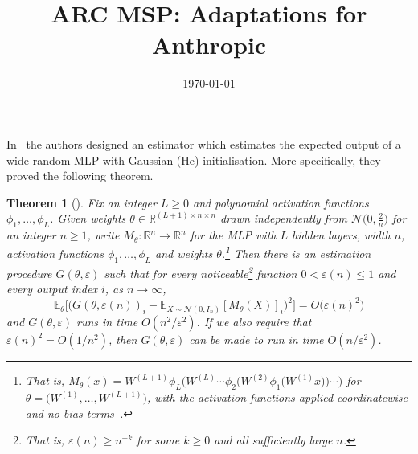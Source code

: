 \documentclass[11pt]{article}
\title{ARC MSP: Adaptations for Anthropic}
\author{}
\date{\today}
\newtheorem{theorem}{Theorem}
\theoremstyle{remark}
\begin{document}
\maketitle

In~\cite{MSP-ARC} the authors designed an estimator which estimates the expected output of a wide random MLP with Gaussian (He) initialisation.
More specifically, they proved the following theorem.

\begin{theorem}[{\cite[Theorems~5.1 and~5.2]{MSP-ARC}}]\label{thm:msp-arc-init}
Fix an integer $L \geq 0$ and polynomial activation functions $\phi_1, \dots, \phi_L$. Given weights $\theta \in \mathbb{R}^{(L+1) \times n \times n}$ drawn independently from $\mathcal{N}\big(0, \frac{2}{n}\big)$ for an integer $n \geq 1$, write $M_\theta \colon \mathbb{R}^n \to \mathbb{R}^n$ for the MLP with $L$ hidden layers, width $n$, activation functions $\phi_1, \dots, \phi_L$ and weights $\theta$.\footnote{That is, $M_\theta(x) = W^{(L+1)} \phi_L\big(W^{(L)} \cdots \phi_2\big(W^{(2)} \phi_1\big(W^{(1)} x\big)\big) \cdots\big)$ for $\theta = \big(W^{(1)}, \dots, W^{(L+1)}\big)$, with the activation functions applied coordinatewise and no bias terms~\cite[Section~2.1]{MSP-ARC}.} Then there is an estimation procedure $G(\theta, \varepsilon)$ such that for every noticeable\footnote{That is, $\varepsilon(n) \geq n^{-k}$ for some $k \geq 0$ and all sufficiently large $n$.} function $0 < \varepsilon(n) \leq 1$ and every output index $i$, as $n \to \infty$,
\[
    \mathbb{E}_\theta\Big[ \big( G(\theta, \varepsilon(n))_i - \mathbb{E}_{X \sim \mathcal{N}(0, I_n)}[M_\theta(X)]_i \big)^2 \Big] = O\big(\varepsilon(n)^2\big)
\]
and $G(\theta, \varepsilon)$ runs in time $O(n^2/\varepsilon^2)$. If we also require that $\varepsilon(n)^2 = O(1/n^2)$, then $G(\theta, \varepsilon)$ can be made to run in time $O(n/\varepsilon^2)$.
\end{theorem}
\end{document}
